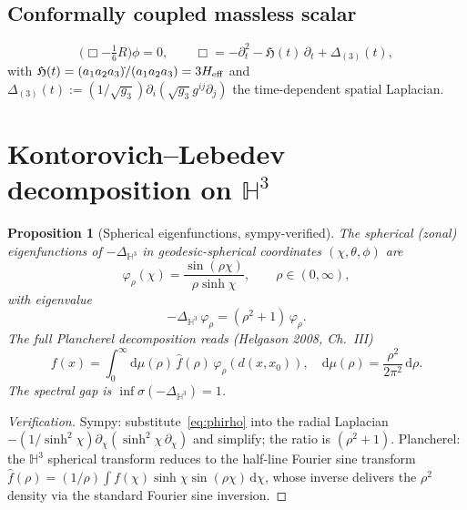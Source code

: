 \documentclass[11pt,a4paper]{article}
\newtheorem{proposition}[theorem]{Proposition}
\theoremstyle{definition}
\newcommand{\HH}{\mathbb{H}}
\newcommand{\dd}{\mathrm{d}}
\newcommand{\Phi}{\varphi}
\begin{document}
\subsection{Conformally coupled massless scalar}
\begin{equation}
\bigl(\Box - \tfrac{1}{6} R\bigr) \phi = 0, \qquad
\Box = -\partial_t^2 - \mathfrak{H}(t)\,\partial_t + \Delta_{(3)}(t),
\end{equation}
with $\mathfrak{H}(t) = (a_1 a_2 a_3)\dot{}/(a_1 a_2 a_3) = 3 H_{\rm eff}$
and $\Delta_{(3)}(t) := (1/\sqrt{g_3}) \partial_i (\sqrt{g_3} g^{ij} \partial_j)$
the time-dependent spatial Laplacian.

\section{Kontorovich--Lebedev decomposition on $\HH^3$}

\begin{proposition}[Spherical eigenfunctions, sympy-verified]
\label{prop:zonal}
The spherical (zonal) eigenfunctions of $-\Delta_{\HH^3}$ in
geodesic-spherical coordinates $(\chi, \theta, \phi)$ are
\begin{equation}
\Phi_\rho(\chi) = \frac{\sin(\rho \chi)}{\rho \sinh \chi}, \qquad \rho \in (0, \infty),
\label{eq:phirho}
\end{equation}
with eigenvalue
\begin{equation}
-\Delta_{\HH^3}\, \Phi_\rho = (\rho^2 + 1)\, \Phi_\rho.
\end{equation}
The full Plancherel decomposition reads (Helgason 2008, Ch.~III)
\begin{equation}
f(x) = \int_0^\infty \dd \mu(\rho)\, \widehat{f}(\rho)\, \Phi_\rho(d(x, x_0)),
\quad \dd \mu(\rho) = \frac{\rho^2}{2\pi^2}\, \dd \rho.
\end{equation}
The spectral gap is $\inf \sigma(-\Delta_{\HH^3}) = 1$.
\end{proposition}

\begin{proof}[Verification]
Sympy: substitute~\eqref{eq:phirho} into the radial Laplacian
$-(1/\sinh^2\chi) \partial_\chi (\sinh^2\chi\, \partial_\chi)$ and simplify;
the ratio is $(\rho^2 + 1)$. Plancherel: the $\HH^3$ spherical transform
reduces to the half-line Fourier sine transform
$\widehat{f}(\rho) = (1/\rho) \int f(\chi) \sinh\chi \sin(\rho\chi)\, \dd\chi$,
whose inverse delivers the $\rho^2$ density via the standard Fourier
sine inversion.
\end{proof}
\end{document}
